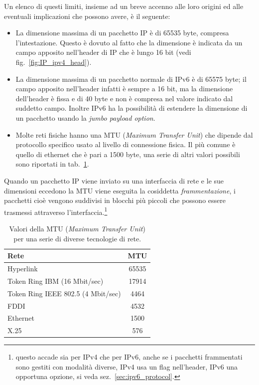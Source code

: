 Un elenco di questi limiti, insieme ad un breve accenno alle loro origini ed
alle eventuali implicazioni che possono avere, è il seguente:
\begin{itemize}
\item La dimensione massima di un pacchetto IP è di 65535 byte, compresa
  l'intestazione. Questo è dovuto al fatto che la dimensione è indicata da un
  campo apposito nell'header di IP che è lungo 16 bit (vedi
  fig.~\ref{fig:IP_ipv4_head}).
\item La dimensione massima di un pacchetto normale di IPv6 è di 65575 byte;
  il campo apposito nell'header infatti è sempre a 16 bit, ma la dimensione
  dell'header è fissa e di 40 byte e non è compresa nel valore indicato dal
  suddetto campo. Inoltre IPv6 ha la possibilità di estendere la dimensione di
  un pacchetto usando la \textit{jumbo payload option}.
\item Molte reti fisiche hanno una MTU (\textit{Maximum Transfer Unit}) che
  dipende dal protocollo specifico usato al livello di connessione fisica. Il
  più comune è quello di ethernet che è pari a 1500 byte, una serie di altri
  valori possibili sono riportati in tab.~\ref{tab:net_mtu_values}.
\end{itemize}

Quando un pacchetto IP viene inviato su una interfaccia di rete e le sue
dimensioni eccedono la MTU viene eseguita la cosiddetta
\textit{frammentazione}, i pacchetti cioè vengono suddivisi in blocchi più
piccoli che possono essere trasmessi attraverso l'interfaccia.\footnote{questo
  accade sia per IPv4 che per IPv6, anche se i pacchetti frammentati sono
  gestiti con modalità diverse, IPv4 usa un flag nell'header, IPv6 una
  opportuna opzione, si veda sez.~\ref{sec:ipv6_protocol}.}

\begin{table}[!htb]
  \centering
  \begin{tabular}[c]{|l|c|}
    \hline
    \textbf{Rete} & \textbf{MTU} \\
    \hline
    \hline
    Hyperlink & 65535 \\
    Token Ring IBM (16 Mbit/sec) & 17914 \\
    Token Ring IEEE 802.5 (4 Mbit/sec) & 4464 \\
    FDDI & 4532 \\
    Ethernet & 1500 \\
    X.25 & 576 \\
    \hline
  \end{tabular}
  \caption{Valori della MTU (\textit{Maximum Transfer Unit}) per una serie di
    diverse tecnologie di rete.} 
  \label{tab:net_mtu_values}
\end{table}

